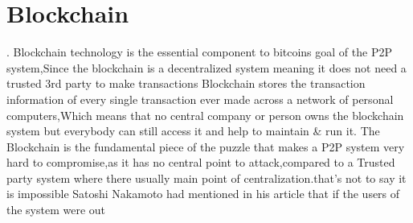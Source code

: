 \documentclass[report]{IEEEtran}
\begin{document}
\section{Blockchain}.\newline
Blockchain technology is the essential component to bitcoins goal of the P2P system,Since the blockchain is a decentralized system meaning it does not need a trusted 3rd party to make transactions \newline Blockchain stores the transaction information of every single transaction ever made across a network of personal computers,Which means that no central company or person owns the blockchain system but everybody can still access it and help to maintain & run it. The Blockchain is the fundamental piece of the puzzle that makes a P2P system very hard to compromise,as it has no central point to attack,compared to a Trusted party system where there usually main point of centralization.that's not to say it is impossible Satoshi Nakamoto had mentioned in his article that if the users of the system were out 
\end{document}
